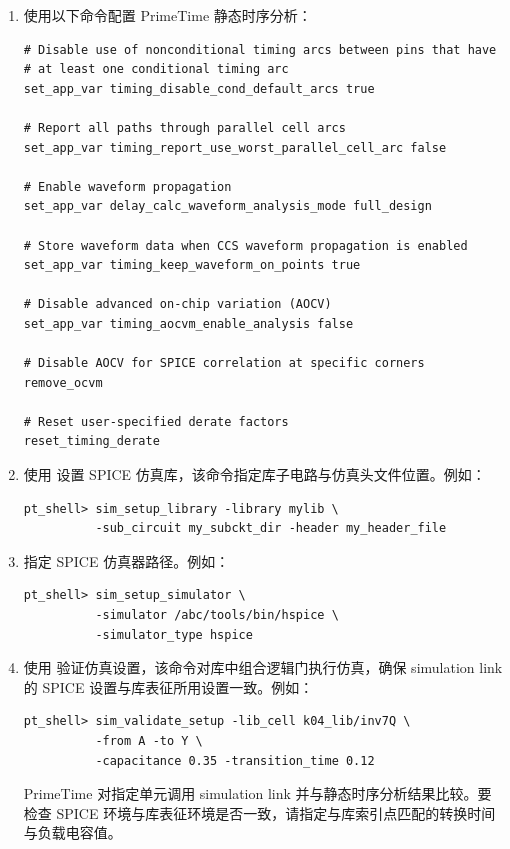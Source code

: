 \begin{enumerate}
  \item 使用以下命令配置 PrimeTime 静态时序分析：
\begin{lstlisting}
# Disable use of nonconditional timing arcs between pins that have
# at least one conditional timing arc
set_app_var timing_disable_cond_default_arcs true

# Report all paths through parallel cell arcs
set_app_var timing_report_use_worst_parallel_cell_arc false

# Enable waveform propagation
set_app_var delay_calc_waveform_analysis_mode full_design

# Store waveform data when CCS waveform propagation is enabled
set_app_var timing_keep_waveform_on_points true

# Disable advanced on-chip variation (AOCV)
set_app_var timing_aocvm_enable_analysis false

# Disable AOCV for SPICE correlation at specific corners
remove_ocvm

# Reset user-specified derate factors
reset_timing_derate
\end{lstlisting}

  \item 使用  设置 SPICE 仿真库，该命令指定库子电路与仿真头文件位置。例如：
\begin{lstlisting}
pt_shell> sim_setup_library -library mylib \
          -sub_circuit my_subckt_dir -header my_header_file
\end{lstlisting}

  \item 指定 SPICE 仿真器路径。例如：
\begin{lstlisting}
pt_shell> sim_setup_simulator \
          -simulator /abc/tools/bin/hspice \
          -simulator_type hspice
\end{lstlisting}

  \item 使用  验证仿真设置，该命令对库中组合逻辑门执行仿真，确保 simulation link 的 SPICE 设置与库表征所用设置一致。例如：
\begin{lstlisting}
pt_shell> sim_validate_setup -lib_cell k04_lib/inv7Q \
          -from A -to Y \
          -capacitance 0.35 -transition_time 0.12
\end{lstlisting}

        PrimeTime 对指定单元调用 simulation link 并与静态时序分析结果比较。要检查 SPICE 环境与库表征环境是否一致，请指定与库索引点匹配的转换时间与负载电容值。


\end{enumerate}
